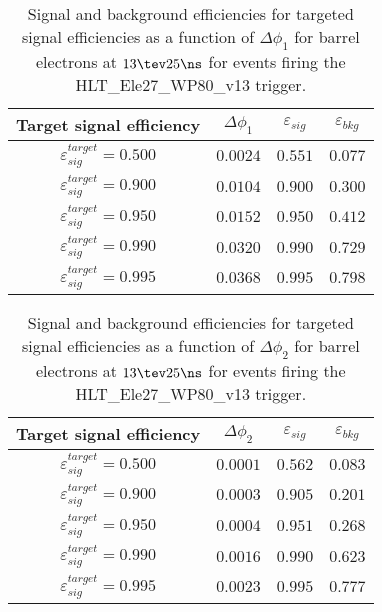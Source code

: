 \clearpage

\begin{table}[!bht]
  \begin{center}
    \begin{tabular}{cccc}
      \hline
      Target signal efficiency & $\Delta\phi_1$ & $\varepsilon_{sig}$ & $\varepsilon_{bkg}$ \\ 
      \hline
      $\varepsilon_{sig}^{target} = 0.500$ & $  0.0024$ & $0.551$ & $0.077$ \\
      $\varepsilon_{sig}^{target} = 0.900$ & $  0.0104$ & $0.900$ & $0.300$ \\
      $\varepsilon_{sig}^{target} = 0.950$ & $  0.0152$ & $0.950$ & $0.412$ \\
      $\varepsilon_{sig}^{target} = 0.990$ & $  0.0320$ & $0.990$ & $0.729$ \\
      $\varepsilon_{sig}^{target} = 0.995$ & $  0.0368$ & $0.995$ & $0.798$ \\
      \hline
    \end{tabular}
    \caption{Signal and background efficiencies for targeted signal efficiencies as a function of $\Delta\phi_1$ for barrel electrons at $13\tev 25\ns$ for events firing the HLT\_Ele27\_WP80\_v13 trigger.}
    \label{tab:eff_rej_phi1_beam_13_25_trigger_27_B}
  \end{center}
\end{table}

\clearpage

\begin{table}[!bht]
  \begin{center}
    \begin{tabular}{cccc}
      \hline
      Target signal efficiency & $\Delta\phi_2$ & $\varepsilon_{sig}$ & $\varepsilon_{bkg}$ \\ 
      \hline
      $\varepsilon_{sig}^{target} = 0.500$ & $  0.0001$ & $0.562$ & $0.083$ \\
      $\varepsilon_{sig}^{target} = 0.900$ & $  0.0003$ & $0.905$ & $0.201$ \\
      $\varepsilon_{sig}^{target} = 0.950$ & $  0.0004$ & $0.951$ & $0.268$ \\
      $\varepsilon_{sig}^{target} = 0.990$ & $  0.0016$ & $0.990$ & $0.623$ \\
      $\varepsilon_{sig}^{target} = 0.995$ & $  0.0023$ & $0.995$ & $0.777$ \\
      \hline
    \end{tabular}
    \caption{Signal and background efficiencies for targeted signal efficiencies as a function of $\Delta\phi_2$ for barrel electrons at $13\tev 25\ns$ for events firing the HLT\_Ele27\_WP80\_v13 trigger.}
    \label{tab:eff_rej_phi2_beam_13_25_trigger_27_B}
  \end{center}
\end{table}

